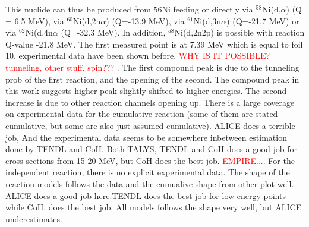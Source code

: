 This nuclide can thus be produced from 56Ni feeding or directly via $^{58}$Ni(d,$\alpha$) (Q = 6.5 MeV), via $^{60}$Ni(d,2n$\alpha$) (Q=-13.9 MeV), via $^{61}$Ni(d,3n$\alpha$) (Q=-21.7 MeV) or via $^{62}$Ni(d,4n$\alpha$ (Q=-32.3 MeV). In addition, $^{58}$Ni(d,2n2p) is possible with reaction Q-value -21.8 MeV. The first measured point is at 7.39 MeV which is equal to foil 10. experimental data have been shown before. \textcolor{red}{WHY IS IT POSSIBLE? tunneling, other stuff, spin??? }. The first compound peak is due to the tunneling prob of the first reaction, and the opening of the second. The compound peak in this work suggests higher peak slightly shifted to higher energies. The second increase is due to other reaction channels opening up. There is a large coverage on experimental data for the cumulative reaction \cite{Ochiai2007, Avrigeanu2016, Takacs2007, Takacs1997, Zweit1991, Usman2016, Amjed2013, Hermanne2013} (some of them are stated cumulative, but some are also just assumed cumulative). ALICE does a terrible job, And the experimental data seems to be somewhere inbetween estimation done by TENDL and CoH. Both TALYS, TENDL and CoH does a good job for cross sections from 15-20 MeV, but CoH does the best job. \textcolor{red}{EMPIRE...}. For the independent reaction, there is no explicit experimental data. The shape of the reaction models follows the data and the cumualive shape from other plot well. ALICE does a good job here.TENDL does the best job for low energy points while CoH, does the best job. All models follows the shape very well, but ALICE underestimates. 





\subsubsection{}


